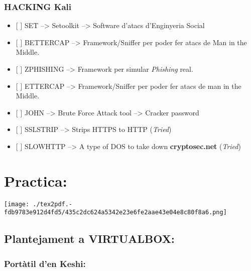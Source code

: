 \documentclass[]{article}
\providecommand{\tightlist}{%
  \setlength{\itemsep}{0pt}\setlength{\parskip}{0pt}}
\begin{document}
\hypertarget{hacking-kali}{%
\subsubsection{\texorpdfstring{\textbf{HACKING
Kali}}{HACKING Kali}}\label{hacking-kali}}

\begin{itemize}
\tightlist
\item
  {[} {]} SET --\textgreater{} Setoolkit --\textgreater{} Software
  d'atacs d'Enginyeria Social
\item
  {[} {]} BETTERCAP --\textgreater{} Framework/Sniffer per poder fer
  atacs de Man in the Middle.
\item
  {[} {]} ZPHISHING --\textgreater{} Framework per simular
  \emph{Phishing} real.
\item
  {[} {]} ETTERCAP --\textgreater{} Framework/Sniffer per poder fer
  atacs de man in the Middle.
\item
  {[} {]} JOHN --\textgreater{} Brute Force Attack tool --\textgreater{}
  Cracker password
\item
  {[} {]} SSLSTRIP --\textgreater{} Strips HTTPS to HTTP (\emph{Tried})
\item
  {[} {]} SLOWHTTP --\textgreater{} A type of DOS to take down
  \textbf{cryptosec.net} (\emph{Tried})
\end{itemize}

\hypertarget{practica}{%
\section{\texorpdfstring{\textbf{Practica:}}{Practica:}}\label{practica}}

\texttt{[image: ./tex2pdf.-fdb9783e912d4fd5/435c2dc624a5342e23e6fe2aae43e04e8c80f8a6.png]}

\hypertarget{plantejament-a-virtualbox}{%
\subsection{\texorpdfstring{\textbf{Plantejament a
VIRTUALBOX}:}{Plantejament a VIRTUALBOX:}}\label{plantejament-a-virtualbox}}

\hypertarget{portuxe0til-den-keshi}{%
\subsubsection{\texorpdfstring{\textbf{Portàtil d'en
Keshi}:}{Portàtil d'en Keshi:}}\label{portuxe0til-den-keshi}}
\end{document}
